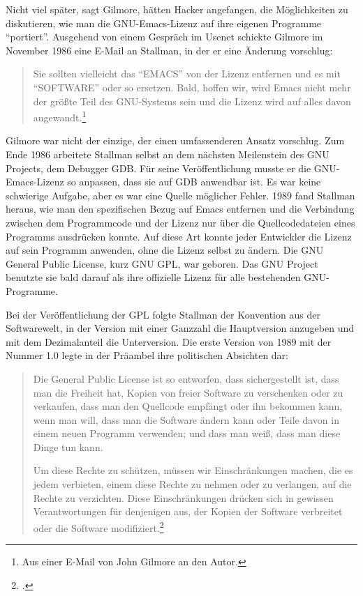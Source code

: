 Nicht viel später, sagt Gilmore, hätten Hacker angefangen, die Möglichkeiten zu diskutieren, wie man die GNU-Emacs-Lizenz auf ihre eigenen Programme "`portiert"'. Ausgehend von einem Gespräch im Usenet schickte Gilmore im November 1986 eine E-Mail an Stallman, in der er eine Änderung vorschlug:

\begin{quote}
Sie sollten vielleicht das "`EMACS"' von der Lizenz entfernen und es mit "`SOFTWARE"' oder so ersetzen. Bald, hoffen wir, wird Emacs nicht mehr der größte Teil des GNU-Systems sein und die Lizenz wird auf alles davon angewandt.\footnote{Aus einer E-Mail von John Gilmore an den Autor.}
\end{quote}

Gilmore war nicht der einzige, der einen umfassenderen Ansatz vorschlug. Zum Ende 1986 arbeitete Stallman selbst an dem nächsten Meilenstein des GNU Projects, dem Debugger GDB. Für seine Veröffentlichung musste er die GNU-Emacs-Lizenz so anpassen, dass sie auf GDB anwendbar ist. Es war keine schwierige Aufgabe, aber es war eine Quelle möglicher Fehler. 1989 fand Stallman heraus, wie man den spezifischen Bezug auf Emacs entfernen und die Verbindung zwischen dem Programmcode und der Lizenz nur über die Quellcodedateien eines Programms ausdrücken konnte. Auf diese Art konnte jeder Entwickler die Lizenz auf sein Programm anwenden, ohne die Lizenz selbst zu ändern. Die GNU General Public License, kurz GNU GPL, war geboren. Das GNU Project benutzte sie bald darauf als ihre offizielle Lizenz für alle bestehenden GNU-Programme.

Bei der Veröffentlichung der GPL folgte Stallman der Konvention aus der Softwarewelt, in der Version mit einer Ganzzahl die Hauptversion anzugeben und mit dem Dezimalanteil die Unterversion. Die erste Version von 1989 mit der Nummer 1.0 legte in der Präambel ihre politischen Absichten dar:

\begin{quote}
Die General Public License ist so entworfen, dass sichergestellt ist, dass man die Freiheit hat, Kopien von freier Software zu verschenken oder zu verkaufen, dass man den Quellcode empfängt oder ihn bekommen kann, wenn man will, dass man die Software ändern kann oder Teile davon in einem neuen Programm verwenden; und dass man weiß, dass man diese Dinge tun kann.

Um diese Rechte zu schützen, müssen wir Einschränkungen machen, die es jedem verbieten, einem diese Rechte zu nehmen oder zu verlangen, auf die Rechte zu verzichten. Diese Einschränkungen drücken sich in gewissen Verantwortungen für denjenigen aus, der Kopien der Software verbreitet oder die Software modifiziert.\footcite[Vgl.][]{gplv1}
\end{quote}

